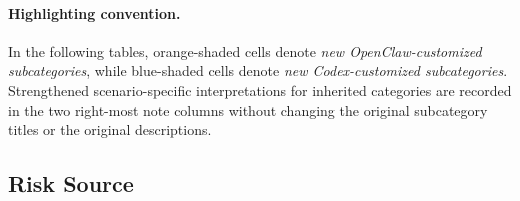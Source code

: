 \documentclass{llmxive}
\begin{document}
\paragraph{Highlighting convention.}
In the following tables, \colorbox{occustom}{orange-shaded cells} denote \emph{new OpenClaw-customized subcategories}, while \colorbox{codcustom}{blue-shaded cells} denote \emph{new Codex-customized subcategories}. Strengthened scenario-specific interpretations for inherited categories are recorded in the two right-most note columns without changing the original subcategory titles or the original descriptions.

\setlength{\LTleft}{0pt}
\setlength{\LTright}{0pt}
\setlength{\LTcapwidth}{\textwidth}
\setlength{\tabcolsep}{3pt}

\subsection{Risk Source}
\label{subsec:openclaw_risk_source_latex}
\end{document}
